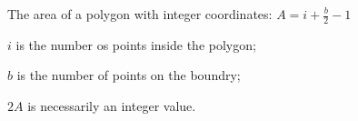 The area of a polygon with integer coordinates:
$A = i + \frac{b}{2} - 1$

$i$ is the number os points inside the polygon;

$b$ is the number of points on the boundry;

$2A$ is necessarily an integer value.